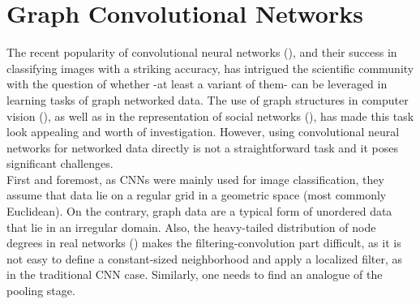 \section{Graph Convolutional Networks}

The recent popularity of convolutional neural networks (\cite{krizhevsky2012imagenet}), and their
success in classifying images with a striking accuracy, has intrigued the scientific
community with the question of whether -at least a variant of them- can be leveraged in learning tasks
of graph networked data. The use of graph structures in computer
vision (\cite{shokoufandeh2000graph}), as well as in the representation of social networks
(\cite{easley2010networks}), has made this task look appealing and worth of investigation.
However, using convolutional neural networks for
networked data directly is not a straightforward task and it poses significant
challenges.\\

 First and foremost,
as CNNs were mainly used for image classification, they assume that
data lie on a regular grid in a geometric space (most commonly
Euclidean). On the contrary, graph data are a typical form of unordered data that lie in
an irregular domain. Also, the heavy-tailed distribution of node degrees
in real networks (\cite{faloutsos1999powerlaw}) makes the filtering-convolution part difficult,
as it is not easy to define a constant-sized neighborhood and apply a
localized filter, as in the traditional CNN case. Similarly, one needs to find an analogue of the pooling stage.\\

